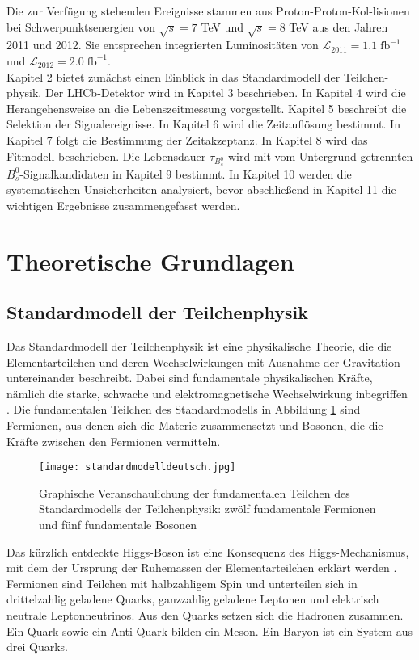 \documentclass{article}
\begin{document}
Die zur Verfügung stehenden Ereignisse stammen aus Proton-Proton-Kol-lisionen bei Schwerpunktsenergien von $\sqrt{s}=7$ TeV und $\sqrt{s}=8$ TeV aus den Jahren 2011 und 2012. Sie entsprechen integrierten Luminositäten von $\mathcal{L}_{2011}= 1.1\;\text{fb}^{-1}$ und $\mathcal{L}_{2012}=2.0\;\text{fb}^{-1}$.
\\

Kapitel 2 bietet zunächst einen Einblick in das Standardmodell der Teilchen-physik. Der LHCb-Detektor wird in Kapitel 3 beschrieben. In Kapitel 4 wird die Herangehensweise an die Lebenszeitmessung vorgestellt. Kapitel 5 beschreibt die Selektion der Signalereignisse. In Kapitel 6 wird die Zeitauflösung bestimmt. In Kapitel 7 folgt die Bestimmung der Zeitakzeptanz. In Kapitel 8 wird das Fitmodell beschrieben. Die Lebensdauer $\tau_{B_s^0}$ wird mit vom Untergrund getrennten $B_s^0$-Signalkandidaten in Kapitel 9 bestimmt. In Kapitel 10 werden die systematischen Unsicherheiten analysiert, bevor abschließend in Kapitel 11 die wichtigen Ergebnisse zusammengefasst werden.


\newpage
\section{Theoretische Grundlagen}
\subsection{Standardmodell der Teilchenphysik}
Das Standardmodell der Teilchenphysik ist eine physikalische Theorie, die die Elementarteilchen und deren Wechselwirkungen mit Ausnahme der Gravitation untereinander beschreibt. Dabei sind fundamentale physikalischen Kräfte, nämlich die starke, schwache und elektromagnetische Wechselwirkung inbegriffen  \cite{glashow,weinberg,Salam}.
Die fundamentalen Teilchen des Standardmodells in Abbildung \ref{fig:sm} sind Fermionen, aus denen sich die Materie zusammensetzt und Bosonen, die die Kräfte zwischen den Fermionen vermitteln. 

\begin{figure}[h]
	\centering
  \texttt{[image: standardmodelldeutsch.jpg]}
	\caption{Graphische Veranschaulichung der fundamentalen Teilchen des Standardmodells der Teilchenphysik: zwölf fundamentale Fermionen und fünf fundamentale Bosonen \cite{sm}}
\label{fig:sm}
\end{figure}

Das kürzlich entdeckte Higgs-Boson \cite{Collaboration2012ahiggs,Collaboration2012higgs} ist eine Konsequenz des Higgs-Mechanismus, mit dem der Ursprung der Ruhemassen der Elementarteilchen erklärt werden \cite{Higgs1964}. Fermionen sind Teilchen mit halbzahligem Spin und unterteilen sich in drittelzahlig geladene Quarks, ganzzahlig geladene Leptonen und elektrisch neutrale Leptonneutrinos. Aus den Quarks setzen sich die Hadronen zusammen. Ein Quark sowie ein Anti-Quark bilden ein Meson. Ein Baryon ist ein System aus drei Quarks. 
\end{document}
